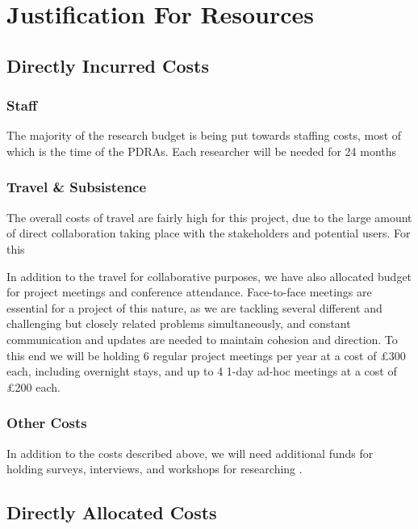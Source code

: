 \documentclass[11pt]{article}
\begin{document}
	\pagebreak
	\section{Justification For Resources}
	
	\subsection{Directly Incurred Costs}
	
	\subsubsection{Staff}
	
	The majority of the research budget is being put towards staffing costs, most of which is the time of the PDRAs. Each researcher will be needed for 24 months 
	
	\subsubsection{Travel \& Subsistence}
	
	The overall costs of travel are fairly high for this project, due to the large amount of direct collaboration taking place with the stakeholders and potential users. For this 
	
	In addition to the travel for collaborative purposes, we have also allocated budget for project meetings and conference attendance. Face-to-face meetings are essential for a project of this nature, as we are tackling several different and challenging but closely related problems simultaneously, and constant communication and updates are needed to maintain cohesion and direction. To this end we will be holding 6 regular project meetings per year at a cost of £300 each, including overnight stays, and up to 4 1-day ad-hoc meetings at a cost of £200 each. 
	
	\subsubsection{Other Costs}
	
	In addition to the costs described above, we will need additional funds for holding surveys, interviews, and workshops for researching . 
	
	\subsection{Directly Allocated Costs}
	
\end{document}
